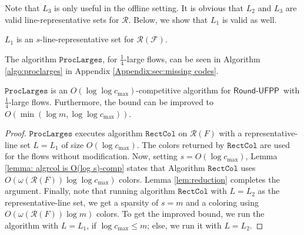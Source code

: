 \documentclass[a4paper,UKenglish]{lipics-v2016}
\newcommand{\rufpp}{\mbox{$\mathsf{Round}$-$\mathsf{UFPP}$}}
\theoremstyle{plain}
\newcommand{\cmax}{c_{\max}}
\newcommand{\cR}{\mathcal{R}}
\newcommand{\algrcol}{\mathtt{RectCol}}
\newcommand{\algruflarge}{\mathtt{RufpLarge}}
\begin{document}
Note that $L_3$ is only useful in the offline setting. It is obvious that $L_2$ and $L_3$ are valid line-representative sets for $\cR$. Below, we show that $L_1$ is valid as well.

\begin{lemma}\label{lem:l1}
$L_1$ is an $s$-line-representative set for $\cR(\mathcal{F})$.
\end{lemma}








The algorithm $\mathtt{ProcLarges}$, for $\frac{1}{4}$-large flows, can be seen in Algorithm \ref{algo:proclarges} in Appendix \ref{Appendix:sec:missing codes}.

\begin{theorem}\label{proc}
$\mathtt{ProcLarges}$ is an $O(\log\log \cmax)$-competitive algorithm for \rufpp\ with $\frac{1}{4}$-large flows. Furthermore, the bound can be improved to $O(\min(\log m, \log\log c_{\max}))$.
\end{theorem}
\begin{proof}
$\mathtt{ProcLarges}$ executes algorithm $\algrcol$ on $\cR(F)$ with a representative-line set $L=L_1$ of size $O(\log\cmax)$. The colors returned by $\algrcol$ are used for the flows without modification. Now, setting $s=O(\log\cmax)$, Lemma \ref{lemma: algrcol is O(log s)-comp} states that Algorithm $\algrcol$ uses $O(\omega(\cR(F))\log\log \cmax)$ colors. Lemma \ref{lem:reduction} completes the argument. Finally, note that running algorithm $\algrcol$ with $L=L_2$ as the representative-line set, we get a sparsity of $s=m$ and a coloring using $O(\omega(\cR(F))\log m)$ colors. To get the improved bound, we run the algorithm with $L=L_1$, if $\log\cmax\leq m$; else, we run it with $L=L_2$.
\end{proof}
\end{document}
